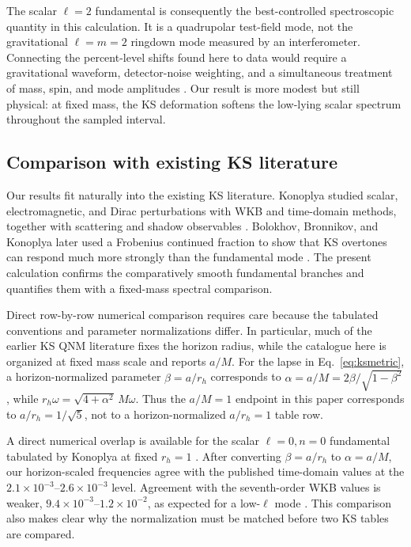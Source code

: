\documentclass[12pt,a4paper]{article}
\begin{document}
The scalar \(\ell=2\) fundamental is consequently the best-controlled
spectroscopic quantity in this calculation. It is a quadrupolar test-field
mode, not the gravitational \(\ell=m=2\) ringdown mode measured by an
interferometer. Connecting the percent-level shifts found here to data would
require a gravitational waveform, detector-noise weighting, and a simultaneous
treatment of mass, spin, and mode amplitudes \cite{Berti2006,Isi2019}. Our
result is more modest but still physical: at fixed mass, the KS deformation
softens the low-lying scalar spectrum throughout the sampled interval.

\subsection{Comparison with existing KS literature}

Our results fit naturally into the existing KS literature. Konoplya studied
scalar, electromagnetic, and Dirac perturbations with WKB and time-domain
methods, together with scattering and shadow observables \cite{Konoplya2020}.
Bolokhov, Bronnikov, and Konoplya later used a Frobenius continued fraction to
show that KS overtones can respond much more strongly than the fundamental
mode \cite{Bolokhov2025}. The present calculation confirms the comparatively
smooth fundamental branches and quantifies them with a fixed-mass spectral
comparison.

Direct row-by-row numerical comparison requires care because the tabulated conventions and parameter normalizations differ. In particular, much of the earlier KS QNM literature fixes the horizon radius, while the catalogue here is organized at fixed mass scale and reports \(a/M\). For the lapse in Eq.~\eqref{eq:ksmetric}, a horizon-normalized parameter \(\beta=a/r_h\) corresponds to \(\alpha=a/M=2\beta/\sqrt{1-\beta^2}\), while \(r_h\omega=\sqrt{4+\alpha^2}\,M\omega\). Thus the \(a/M=1\) endpoint in this paper corresponds to \(a/r_h=1/\sqrt{5}\), not to a horizon-normalized \(a/r_h=1\) table row.

A direct numerical overlap is available for the scalar \(\ell=0,n=0\)
fundamental tabulated by Konoplya at fixed \(r_h=1\) \cite{Konoplya2020}.
After converting \(\beta=a/r_h\) to \(\alpha=a/M\), our horizon-scaled
frequencies agree with the published time-domain values at the
\(2.1\times10^{-3}\)--\(2.6\times10^{-3}\) level. Agreement with the
seventh-order WKB values is weaker, \(9.4\times10^{-3}\)--\(1.2\times10^{-2}\),
as expected for a low-\(\ell\) mode \cite{Konoplya2003,Konoplya2011}. This
comparison also makes clear why the normalization must be matched before two
KS tables are compared.
\end{document}
